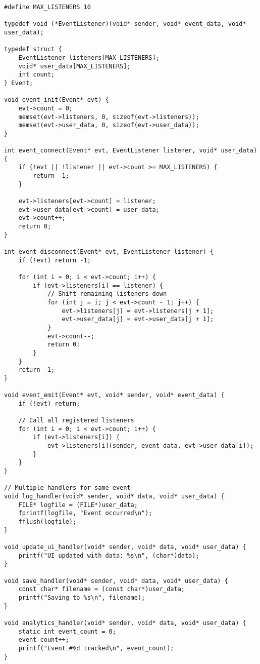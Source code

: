 \begin{lstlisting}
#define MAX_LISTENERS 10

typedef void (*EventListener)(void* sender, void* event_data, void* user_data);

typedef struct {
    EventListener listeners[MAX_LISTENERS];
    void* user_data[MAX_LISTENERS];
    int count;
} Event;

void event_init(Event* evt) {
    evt->count = 0;
    memset(evt->listeners, 0, sizeof(evt->listeners));
    memset(evt->user_data, 0, sizeof(evt->user_data));
}

int event_connect(Event* evt, EventListener listener, void* user_data) {
    if (!evt || !listener || evt->count >= MAX_LISTENERS) {
        return -1;
    }

    evt->listeners[evt->count] = listener;
    evt->user_data[evt->count] = user_data;
    evt->count++;
    return 0;
}

int event_disconnect(Event* evt, EventListener listener) {
    if (!evt) return -1;

    for (int i = 0; i < evt->count; i++) {
        if (evt->listeners[i] == listener) {
            // Shift remaining listeners down
            for (int j = i; j < evt->count - 1; j++) {
                evt->listeners[j] = evt->listeners[j + 1];
                evt->user_data[j] = evt->user_data[j + 1];
            }
            evt->count--;
            return 0;
        }
    }
    return -1;
}

void event_emit(Event* evt, void* sender, void* event_data) {
    if (!evt) return;

    // Call all registered listeners
    for (int i = 0; i < evt->count; i++) {
        if (evt->listeners[i]) {
            evt->listeners[i](sender, event_data, evt->user_data[i]);
        }
    }
}

// Multiple handlers for same event
void log_handler(void* sender, void* data, void* user_data) {
    FILE* logfile = (FILE*)user_data;
    fprintf(logfile, "Event occurred\n");
    fflush(logfile);
}

void update_ui_handler(void* sender, void* data, void* user_data) {
    printf("UI updated with data: %s\n", (char*)data);
}

void save_handler(void* sender, void* data, void* user_data) {
    const char* filename = (const char*)user_data;
    printf("Saving to %s\n", filename);
}

void analytics_handler(void* sender, void* data, void* user_data) {
    static int event_count = 0;
    event_count++;
    printf("Event #%d tracked\n", event_count);
}


\end{lstlisting}

